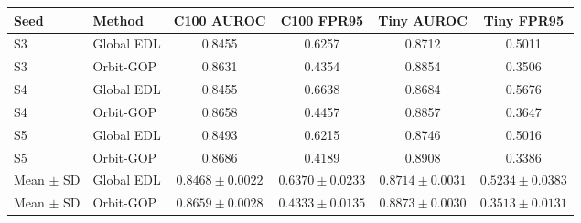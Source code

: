 \begingroup
\footnotesize
\setlength{\tabcolsep}{3pt}
\renewcommand{\arraystretch}{1.1}
\begin{longtable}{@{}llcccc@{}}
\toprule
Seed & Method & C100 AUROC & C100 FPR95 & Tiny AUROC & Tiny FPR95 \\
\midrule
\endhead
\bottomrule
\endlastfoot
S3 & Global EDL & 0.8455 & 0.6257 & 0.8712 & 0.5011 \\
S3 & Orbit-GOP & 0.8631 & 0.4354 & 0.8854 & 0.3506 \\
S4 & Global EDL & 0.8455 & 0.6638 & 0.8684 & 0.5676 \\
S4 & Orbit-GOP & 0.8658 & 0.4457 & 0.8857 & 0.3647 \\
S5 & Global EDL & 0.8493 & 0.6215 & 0.8746 & 0.5016 \\
S5 & Orbit-GOP & 0.8686 & 0.4189 & 0.8908 & 0.3386 \\
Mean $\pm$ SD & Global EDL & $0.8468 \pm 0.0022$ & $0.6370 \pm 0.0233$ & $0.8714 \pm 0.0031$ & $0.5234 \pm 0.0383$ \\
Mean $\pm$ SD & Orbit-GOP & $0.8659 \pm 0.0028$ & $0.4333 \pm 0.0135$ & $0.8873 \pm 0.0030$ & $0.3513 \pm 0.0131$ \\
\end{longtable}
\endgroup
